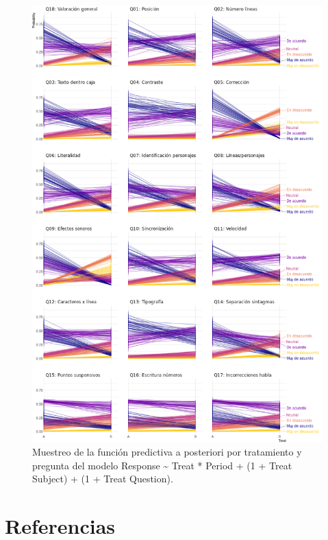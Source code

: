 \documentclass[
  12pt,
  a4paper,
  extrafontsizes,
  onecolumn,
  openright,
  table]{memoir}
\begin{document}
\begin{figure}[h]

{\centering \includegraphics[width=1\textwidth,height=\textheight]{images/bayes-preg.png}

}

\caption{\label{fig-pred-3}Muestreo de la función predictiva a
posteriori por tratamiento y pregunta del modelo Response
\textasciitilde{} Treat * Period + (1 + Treat \textbar{} Subject) + (1 +
Treat \textbar{} Question).}

\end{figure}


\hypertarget{referencias}{%
\chapter*{Referencias}\label{referencias}}
\end{document}
